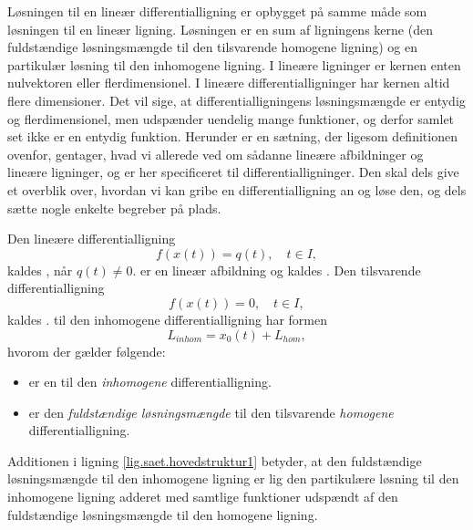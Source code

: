 Løsningen til en lineær differentialligning er opbygget på samme måde som løsningen til en lineær ligning. Løsningen er en sum af ligningens kerne (den fuldstændige løs\-nings\-mæng\-de til den tilsvarende homogene ligning) og en partikulær løsning til den inhomogene ligning. I lineære ligninger er kernen enten nulvektoren eller flerdimensionel. I lineære differentialligninger har kernen altid flere dimensioner. Det vil sige, at differentialligningens løsningsmængde er entydig og flerdimensionel, men udspænder uendelig mange funktioner, og derfor samlet set ikke er en entydig funktion. \bs
Herunder er en sætning, der ligesom definitionen ovenfor, gentager, hvad vi allerede ved om sådanne lineære afbildninger og lineære ligninger, og er her specificeret til differentialligninger. Den skal dels give et overblik over, hvordan vi kan gribe en differentialligning an og løse den, og dels sætte nogle enkelte begreber på plads.

\begin{theorem}[Løsningsstruktur] \label{saet.hovedstruktur1}
Den lineære differentialligning
\begin{equation}
f(x(t)) = q(t), \quad t \in I,
\end{equation}
kaldes , når $ q(t) \neq 0 $.  er en lineær afbildning og  kaldes . Den tilsvarende differentialligning
\begin{equation}
f(x(t)) = 0, \quad t \in I,
\end{equation}
kaldes . \bs 
{}  til den inhomogene differentialligning har formen
\begin{equation}
L_{inhom} = x_0(t) + L_{hom}, \label{lig.saet.hovedstruktur1}
\end{equation}
hvorom der gælder følgende:
\begin{itemize}
\item {} er en  til den \textit{inhomogene} differentialligning.
\item {} er den \textit{fuldstændige løsningsmængde} til den tilsvarende \textit{homogene} differentialligning.
\end{itemize}
Additionen i ligning \eqref{lig.saet.hovedstruktur1} betyder, at den fuldstændige løsningsmængde til den inhomogene ligning er lig den partikulære løsning til den inhomogene ligning adderet med samtlige funktioner udspændt af den fuldstændige løsningsmængde til den homogene ligning.
\end{theorem}
 
